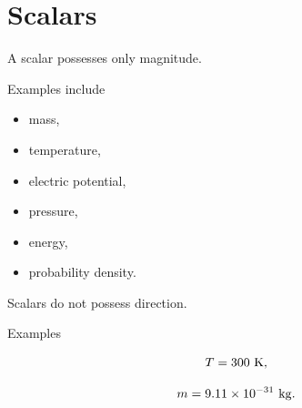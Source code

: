 \section{Scalars}

A scalar possesses only magnitude.

Examples include

\begin{itemize}
	\item mass,
	\item temperature,
	\item electric potential,
	\item pressure,
	\item energy,
	\item probability density.
\end{itemize}

Scalars do not possess direction.

Examples

\[
T=300\ {\rm K},
\]

\[
m=9.11\times10^{-31}\ {\rm kg}.
\]

